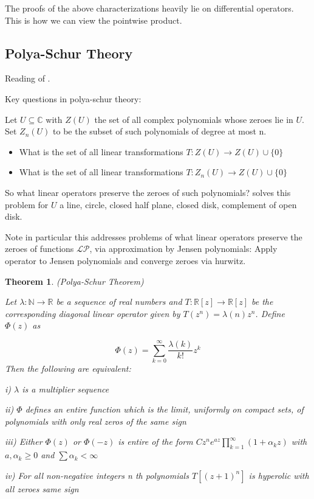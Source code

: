 \documentclass[10pt]{article}
\newcommand{\1}{\textbf{1}}
\newcommand{\R}{\mathbb{R}}
\newcommand{\C}{\mathbb{C}}
\newcommand{\N}{\mathbb{N}}
\newcommand{\pP}{\mathcal{P}}
\newcommand{\lL}{\mathcal{L}}
\newtheorem{theorem}{Theorem}
\theoremstyle{remark}
\theoremstyle{definition}
\theoremstyle{prop}
\theoremstyle{Corollary}
\begin{document}
The proofs of the above characterizations heavily lie on differential operators. This is how we can view the pointwise product. 


\subsection{Polya-Schur Theory}

Reading of \cite{BB}.

Key questions in polya-schur theory:

Let $U \subseteq \C$ with $Z(U)$ the set of all complex polynomials whose zeroes lie in $U$. Set $Z_n(U)$ to be the subset of such polynomials of degree at most n. 

\begin{itemize}
	\item What is the set of all linear transformations $T : Z(U) \to Z(U) \cup \{0\}$
	\item What is the set of all linear transformations $T : Z_n(U) \to Z(U) \cup \{0\}$
\end{itemize}

So what linear operators preserve the zeroes of such polynomials? \cite{BB} solves this problem for $U$ a line, circle, closed half plane, closed disk, complement of open disk. 

Note in particular this addresses problems of what linear operators preserve the zeroes of functions $\lL \pP$, via approximation by Jensen polynomials: Apply operator to Jensen polynomials and converge zeroes via hurwitz.

\begin{theorem}(Polya-Schur Theorem)

	Let $\lambda : \N \to \R$ be a sequence of real numbers and $T: \R[z] \to \R[z]$ be the corresponding diagonal linear operator given by $T(z^n) = \lambda(n) z^n$. Define $\Phi(z)$ as

\[
	\Phi(z) = \sum_{k=0}^{\infty} \frac{\lambda(k)}{k!}z^k
\]
Then the following are equivalent:
	
	i) $\lambda$ is a multiplier sequence

	ii) $\Phi$ defines an entire function which is the limit, uniformly on compact sets, of polynomials with only real zeros of the same sign

	iii) Either $\Phi(z)$ or $\Phi(-z)$ is entire of the form $C z^n e^{az}\prod_{k=1}^{\infty}(1+\alpha_k z)$ with $a,\alpha_k \geq 0$ and $\sum \alpha_k < \infty$

	iv) For all non-negative integers n th polynomials $T[(z+1)^n]$ is hyperolic with all zeroes same sign
\end{theorem}
\end{document}
